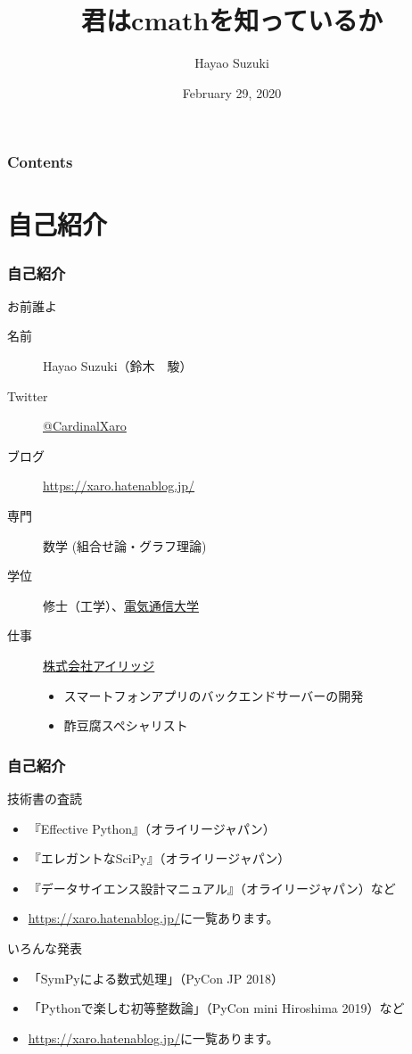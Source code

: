 \documentclass[dvipdfmx,11pt,notheorems]{beamer}
\title[All about cmath module]{君はcmathを知っているか}
\author[Hayao]{Hayao Suzuki}
\institute[Shizuoka 2020]{PyCon mini Shizuoka 2020}
\date{February 29, 2020}
\theoremstyle{definition}
\begin{document}
\begin{frame}[plain]\frametitle{}
\titlepage %
\end{frame}

\begin{frame}\frametitle{Contents}
\tableofcontents %
\end{frame}

\section{自己紹介}

\begin{frame}\frametitle{自己紹介}

\begin{block}{お前誰よ}
\begin{description}
\item[名前] Hayao Suzuki（鈴木　駿）
\item[Twitter] \href{https://twitter.com/CardinalXaro}{@CardinalXaro}
\item[ブログ] \url{https://xaro.hatenablog.jp/}
\item[専門] 数学 (組合せ論・グラフ理論)
\item[学位] 修士（工学）、\href{https://www.uec.ac.jp/}{電気通信大学}
\item[仕事] \href{https://iridge.jp/}{株式会社アイリッジ}
\begin{itemize}
\item スマートフォンアプリのバックエンドサーバーの開発
\item 酢豆腐スペシャリスト
\end{itemize}
\end{description}
\end{block}

\end{frame}

\begin{frame}\frametitle{自己紹介}

\begin{block}{技術書の査読}
\begin{itemize}
\item 『Effective Python』（オライリージャパン）
\item 『エレガントなSciPy』（オライリージャパン）
\item 『データサイエンス設計マニュアル』（オライリージャパン）など
\item \url{https://xaro.hatenablog.jp/}に一覧あります。
\end{itemize}
\end{block}

\begin{block}{いろんな発表}
\begin{itemize}
\item 「SymPyによる数式処理」（PyCon JP 2018）
\item 「Pythonで楽しむ初等整数論」（PyCon mini Hiroshima 2019）など
\item \url{https://xaro.hatenablog.jp/}に一覧あります。
\end{itemize}
\end{block}

\end{frame}
\end{document}
